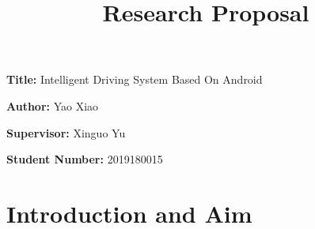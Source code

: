 \documentclass[12pt, a4paper]{article}
\title{Research Proposal}
\author{}
\date{}
\newcommand{\namelistlabel}[1]{\mbox{#1}\hfil}
\newenvironment{namelist}[1]{%

\begin{list}{}
    {
        \let\makelabel\namelistlabel
        \settowidth{\labelwidth}{#1}
        \setlength{\leftmargin}{1.1\labelwidth}
    }
  }{%
\end{list}}
\begin{document}
\maketitle

\begin{namelist}{xxxxxxxxxxxx}
\item[{\bf Title:}]
  Intelligent Driving System Based On Android
\item[{\bf Author:}]
  Yao Xiao	
\item[{\bf Supervisor:}]
  Xinguo Yu
\item[{\bf Student Number:}]
  2019180015
\end{namelist}

\section*{Introduction and Aim} 
\end{document}
